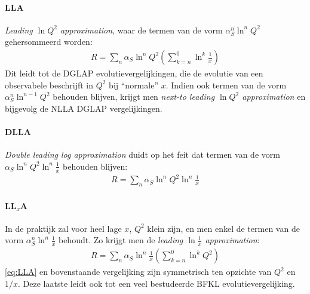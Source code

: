 \documentclass[a4paper,11pt]{article}
\numberwithin{equation}{section} %
\begin{document}
      \paragraph{LLA}
\textit{Leading $\ln{Q^2}$ approximation}, waar de termen van de vorm $\alpha_S^n \ln^n{Q^2}$ gehersommeerd worden:
\begin{align} \label{eq:LLA}
R = \sum_n \alpha_S \ln^n{Q^2} \left( \sum_{k=n}^0 \ln^k{\frac{1}{x}} \right)
\end{align}
Dit leidt tot de DGLAP evolutievergelijkingen, die de evolutie van een observabele beschrijft in $Q^2$ bij “normale” $x$.
Indien ook termen van de vorm $\alpha_S^n \ln^{n-1}{Q^2}$ behouden blijven, krijgt men \textit{next-to leading $\ln{Q^2}$ approximation} en bijgevolg de NLLA DGLAP vergelijkingen.

      \paragraph{DLLA}
\textit{Double leading log approximation} duidt op het feit dat termen van de vorm $\alpha_S \ln^n{Q^2} \ln^n{\frac{1}{x}}$ behouden blijven:
\begin{align}
R = \sum_n \alpha_S \ln^n{Q^2} \ln^n{\frac{1}{x}}
\end{align}

      \paragraph{LL$_x$A}
In de praktijk zal voor heel lage $x$, $Q^2$ klein zijn, en men enkel de termen van de vorm $\alpha_S^n \ln^n{\frac{1}{x}}$ behoudt. Zo krijgt men de \textit{leading $\ln{\frac{1}{x}}$ approximation}:
\begin{align}
R = \sum_n \alpha_S \ln^n{\frac{1}{x}} \left( \sum_{k=n}^0 \ln^k{Q^2} \right)
\end{align}
\eqref{eq:LLA} en bovenstaande vergelijking zijn symmetrisch ten opzichte van $Q^2$ en $1/x$. Deze laatste leidt ook tot een veel bestudeerde BFKL evolutievergelijking.
\end{document}
